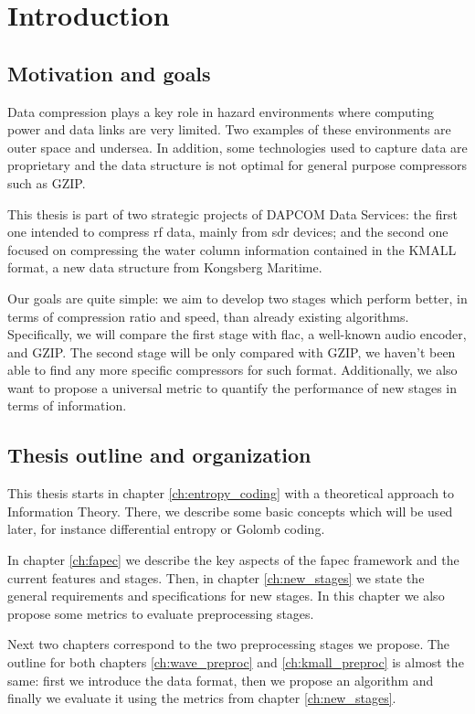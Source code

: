 \chapter{Introduction}
\section{Motivation and goals}
Data compression plays a key role in hazard environments where computing power and data links are very limited. Two examples of these environments are outer space and undersea. In addition, some technologies used to capture data are proprietary and the data structure is not optimal for general purpose compressors such as GZIP.

This thesis is part of two strategic projects of DAPCOM Data Services: the first one intended to compress \acrfull{rf} data, mainly from \acrshort{sdr} devices; and the second one focused on compressing the water column information contained in the KMALL format, a new data structure from Kongsberg Maritime.

Our goals are quite simple: we aim to develop two stages which perform better, in terms of compression ratio and speed, than already existing algorithms. Specifically, we will compare the first stage with \acrshort{flac}, a well-known audio encoder, and GZIP. The second stage will be only compared with GZIP, we haven't been able to find any more specific compressors for such format. Additionally, we also want to propose a universal metric to quantify the performance of new stages in terms of information.

\section{Thesis outline and organization}
This thesis starts in chapter \ref{ch:entropy_coding} with a theoretical approach to Information Theory. There, we describe some basic concepts which will be used later, for instance differential entropy or Golomb coding.

In chapter \ref{ch:fapec} we describe the key aspects of the \acrshort{fapec} framework and the current features and stages. Then, in chapter \ref{ch:new_stages} we state the general requirements and specifications for new stages. In this chapter we also propose some metrics to evaluate preprocessing stages.

Next two chapters correspond to the two preprocessing stages we propose. The outline for both chapters \ref{ch:wave_preproc} and \ref{ch:kmall_preproc} is almost the same: first we introduce the data format, then we propose an algorithm and finally we evaluate it using the metrics from chapter \ref{ch:new_stages}.

